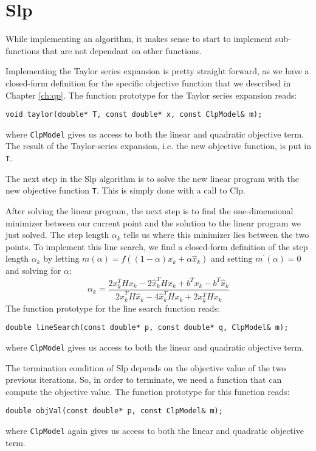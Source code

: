 \section{Slp}
While implementing an algorithm, it makes sense to start to implement
sub-functions that are not dependant on other functions. 

Implementing the Taylor series expansion is pretty straight forward, as
we have a closed-form definition for the specific objective function that
we described in Chapter \ref{ch:qp}. The function prototype for the
Taylor series expansion reads:
\begin{verbatim}
void taylor(double* T, const double* x, const ClpModel& m);
\end{verbatim}
where \texttt{ClpModel} gives us access to both the linear and quadratic
objective term. The result of the Taylor-series expansion, i.e. the new
objective function, is put in \texttt{T}.

The next step in the Slp algorithm is to solve the new linear program with the
new objective function \texttt{T}. This is simply done with a call to Clp.

After solving the linear program, the next step is to find the one-dimensional
minimizer between our current point and the solution to the linear program we
just solved.
The step length $\alpha_k$ tells us where this minimizer lies between the two
points.
To implement this line search, we find a closed-form definition of the step
length $\alpha_k$ by letting $m(\alpha) = f((1-\alpha) x_k + \alpha \hat{x}_k)$
and setting $m^\prime(\alpha) = 0$ and solving for $\alpha$:
\[
\alpha_k = \frac{
                2x_k^T H x_k
                - 2\hat{x}_k^T H x_k
                + b^T x_k - b^T \hat{x}_k
                }{
                  2\hat{x}_k^T H \hat{x}_k
                - 4\hat{x}_k^T H x_k
                + 2x_k^T H x_k
                }
\]
The function prototype for the line search function reads:
\begin{verbatim}
double lineSearch(const double* p, const double* q, ClpModel& m);
\end{verbatim}
where \texttt{ClpModel} gives us access to both the linear and quadratic
objective term.

The termination condition of Slp depends on the objective value of the two
previous iterations. So, in order to terminate, we need a function that can
compute the objective value. The function prototype for this function reads:
\begin{verbatim}
double objVal(const double* p, const ClpModel& m);
\end{verbatim}
where \texttt{ClpModel} again gives us access to both the linear and quadratic
objective term.

